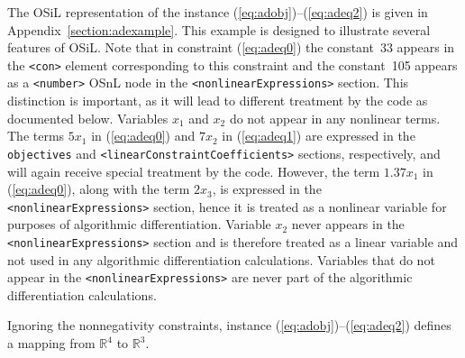 \documentclass[11pt]{article}
\renewcommand{\_}{{\char"5F}}
\renewcommand{\{}{{\char"7B}}
\renewcommand{\}}{{\char"7D}}
\renewcommand{\^}{{\char"0D}}
\renewcommand{\'}{{\char"0D}}
\begin{document}
\begin{enumerate}[Step 1:]
The OSiL representation of the instance  (\ref{eq:adobj})--(\ref{eq:adeq2}) is given in Appendix~\ref{section:adexample}.
This example is designed to illustrate several features of OSiL. Note that in constraint  (\ref{eq:adeq0}) the 
constant~33 appears in the {\tt <con>} element corresponding to this constraint
and the constant~105 appears as a {\tt <number>} OSnL node in the {\tt <nonlinearExpressions>} section.
This distinction is important, as it will lead to different treatment by the code as documented below. 
Variables $x_{1}$ and $x_{2}$  do not appear in any nonlinear terms. 
The terms $5x_{1}$ in  (\ref{eq:adeq0}) and $7 x_{2}$ in (\ref{eq:adeq1}) are expressed in the 
{\tt objectives} and {\tt <linearConstraintCoefficients>} sections, respectively, and will again 
receive special treatment by the code. However, the term $1.37x_1$ in (\ref{eq:adeq0}),
along with the term $2x_3$, is expressed in the {\tt <nonlinearExpressions>} section,
hence it  is treated as a nonlinear variable for purposes of algorithmic differentiation. 
Variable $x_{2}$ never appears in the  {\tt <nonlinearExpressions>} section and is therefore treated as a linear variable and not used  in any algorithmic differentiation calculations. 
Variables that do not appear in the {\tt <nonlinearExpressions>} are never part of the algorithmic differentiation calculations.

Ignoring the nonnegativity constraints, instance (\ref{eq:adobj})--(\ref{eq:adeq2})  defines a mapping  from $ \mathbb{R}^{4}$ to $ \mathbb{R}^{3}$.





\end{enumerate}
\end{document}
